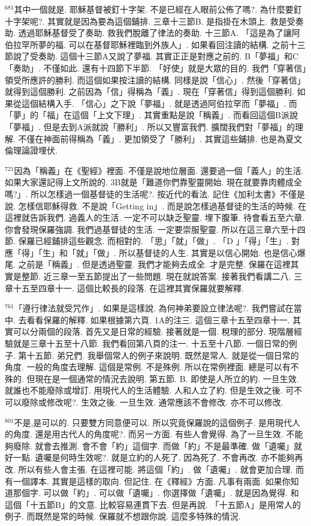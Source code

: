 \documentclass{book}
\begin{document}
$^{681}$其中一個就是.
耶穌基督被釘十字架.
不是已經在人眼前公佈了嗎?.
為什麼要釘十字架呢?.
其實就是因為要為這個鋪排.
三章十三節B.
是指掛在木頭上.
救是受奏助.
透過耶穌基督受了奏助.
救我們脫離了律法的奏助.
十三節A.
「這是為了讓阿伯拉罕所夢的福.
可以在基督耶穌裡臨到外族人」.
如果看回注讀的結構.
之前十三節說了受奏助.
這個十三節A又說了夢福.
其實正正是對應之前的.
B「夢福」和C「奏助」.
不僅如此.
還有十四節下半節.
「好使」就是大眾的目的.
我們「穿著信」領受所應許的勝利.
而這個如果按注讀的結構.
同樣是說「信心」.
然後「穿著信」就得到這個勝利.
之前因為「信」得稱為「義」.
現在「穿著信」得到這個勝利.
如果從這個結構入手.
「信心」之下說「夢福」.
就是透過阿伯拉罕而「夢福」.
而「夢」的「福」在這個「上文下理」.
其實重點是說「稱義」.
而看回這個B派說「夢福」.
但是去到A派就說「勝利」.
所以又豐富我們.
擴闊我們對「夢福」的理解.
不僅在神面前得稱為「義」.
更加領受了「勝利」.
其實這些鋪排.
也是為夏文倫理論證埋伏.

$^{721}$因為「稱義」在《聖經》裡面.
不僅是說地位層面.
還要過一個「義人」的生活.
如果大家還記得上文所說的.
3B就是「難道你們靠聖靈開始.
現在就要靠肉體成全嗎?」.
所以怎樣過一個基督徒的生活呢?.
按近代的看法.
記住《加利太書》不僅是說.
怎樣信耶穌得救.
不是說「Getting in」.
而是說怎樣過基督徒的生活的時候.
在這裡就告訴我們.
過義人的生活.
一定不可以缺乏聖靈.
埋下腹筆.
待會看五至六章.
你會發現保羅強調.
我們過基督徒的生活.
一定要崇服聖靈.
所以在這三章六至十四節.
保羅已經鋪排這些觀念.
而相對的.
「思」「就」「做」.
「D 」「得」「生」.
對應「得」「生」和「就」「做」.
所以基督徒的人生.
其實是以信心開始.
也是信心爆尾.
之前是「稱義」.
但是透過聖靈.
我們才能夠去成全.
才是完整.
保羅在這裡其實是整節.
近三章一至五節提出了一些問題.
現在就說答案.
接著我們看講二八.
三章十五至四章十一.
這個比較長的段落.
在這裡其實保羅就要解釋.

$^{761}$「遵行律法就受咒作」.
如果是這樣說.
為何神弟要設立律法呢?.
我們嘗試在當中.
去看看保羅的解釋.
如果根據第六頁.
1A的注三.
這個三章十五至四章十一.
其實可以分兩個的段落.
首先又是日常的經驗.
接著就是一個.
稅理的部分.
現階層經驗就是三章十五至十八節.
我們看回第八頁的注一.
十五至十八節.
一個日常的例子.
第十五節.
弟兄們.
我舉個常人的例子來說明.
既然是常人.
就是從一個日常的角度.
一般的角度去理解.
這個是常例.
不是殊例.
所以在常例裡面.
總是可以有不殊的.
但現在是一個通常的情況去說明.
第五節.
B.
即使是人所立的約.
一旦生效.
就誰也不能廢除或增訂.
用現代人的生活體驗.
人和人立了約.
但是生效之後.
可不可以廢除或修改呢?.
生效之後.
一旦生效.
通常應該不會修改.
亦不可以修改.

$^{801}$不是,是可以的.
只要雙方同意便可以.
所以究竟保羅說的這個例子.
是用現代人的角度.
還是用古代人的角度呢?.
而另一方面.
有些人會覺得.
為了一旦生效.
不能夠廢除.
就會去推測.
會不會「約」這個字.
而做「約」不是最準確.
做「遺囑」就好一點.
遺囑是何時生效呢?.
就是立約的人死了.
因為死了.
不會再改.
亦不能夠再改.
所以有些人會主張.
在這裡可能.
將這個「約」.
做「遺囑」.
就會更加合理.
而有一個譯本.
其實是這樣的取向.
但記住.
在《釋經》方面.
凡事有兩面.
如果你知道那個字.
可以做「約」.
可以做「遺囑」.
你選擇做「遺囑」.
就是因為覺得.
和這個「十五節B」的文意.
比較容易連貫下去.
但是再說.
「十五節A」是用常人的例子.
而既然是常的時候.
保羅就不想跟你說.
這麼多特殊的情況.
\end{document}
